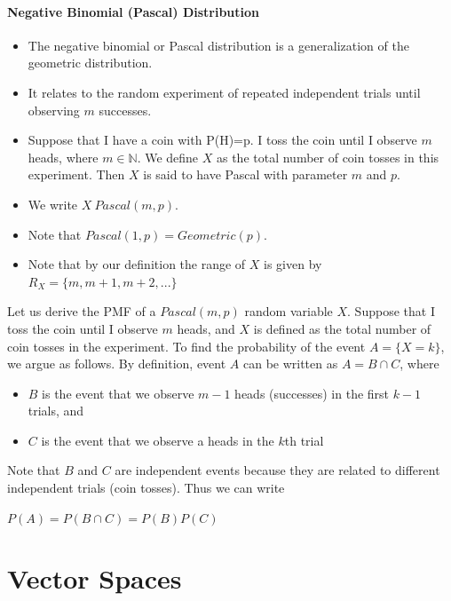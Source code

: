 \documentclass{report}
\begin{document}
\subsubsection{Negative Binomial (Pascal) Distribution}
\begin{itemize}
	\item The negative binomial or Pascal distribution is a generalization of the geometric distribution.
    \item It relates to the random experiment of repeated independent trials until observing $m$ successes.
    \item Suppose that I have a coin with P(H)=p. I toss the coin until I observe $m$ heads, where $m \in \mathbb{N}$. We define $X$ as the total number of coin tosses in this experiment. Then $X$ is said to have Pascal with parameter $m$ and $p$.
    \item We write $X~Pascal(m,p)$.
    \item Note that $Pascal(1,p)=Geometric(p)$.
    \item Note that by our definition the range of $X$ is given by $R_X=\{m,m+1,m+2,...\}$
\end{itemize}

\noindent Let us derive the PMF of a $Pascal(m,p)$ random variable $X$. Suppose that I toss the coin until I observe $m$ heads, and $X$ is defined as the total number of coin tosses in the experiment. To find the probability of the event $A=\{X=k\}$, we argue as follows. By definition, event $A$ can be written as $A=B \cap C$, where\newline
\begin{itemize}
	\item $B$ is the event that we observe $m-1$ heads (successes) in the first $k-1$ trials, and
    \item $C$ is the event that we observe a heads in the $k$th trial
\end{itemize}

\noindent Note that $B$ and $C$ are independent events because they are related to different independent trials (coin tosses).\newline
\noindent Thus we can write\newline
\centerline{$P(A) = P(B \cap C) = P(B)P(C)$}\newline\newline




\chapter{Vector Spaces}
\end{document}
